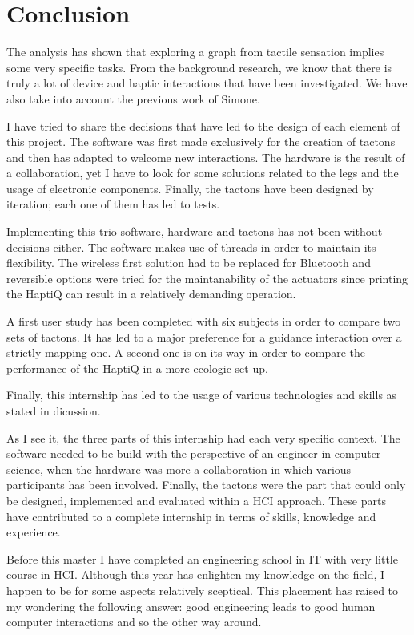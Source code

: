 \chapter{Conclusion}

The analysis has shown that exploring a graph from tactile sensation implies some very specific tasks. From the background research, we know that there is truly a lot of device and haptic interactions that have been investigated. We have also take into account the previous work of Simone.

I have tried to share the decisions that have led to the design of each element of this project. The software was first made exclusively for the creation of tactons and then has adapted to welcome new interactions. The hardware is the result of a collaboration, yet I have to look for some solutions related to the legs and the usage of electronic components. Finally, the tactons have been designed by iteration; each one of them has led to tests.

Implementing this trio software, hardware and tactons has not been without decisions either. The software makes use of threads in order to maintain its flexibility. The wireless first solution had to be replaced for Bluetooth and reversible options were tried for the maintanability of the actuators since printing the HaptiQ can result in a relatively demanding operation.

A first user study has been completed with six subjects in order to compare two sets of tactons. It has led to a major preference for a guidance interaction over a strictly mapping one. A second one is on its way in order to compare the performance of the HaptiQ in a more ecologic set up.

Finally, this internship has led to the usage of various technologies and skills as stated in dicussion.

As I see it, the three parts of this internship had each very specific context. The software needed to be build with the perspective of an engineer in computer science, when the hardware was more a collaboration in which various participants has been involved. Finally, the tactons were the part that could only be designed, implemented and evaluated within a HCI approach. These parts have contributed to a complete internship in terms of skills, knowledge and experience.

Before this master I have completed an engineering school in IT with very little course in HCI. Although this year has enlighten my knowledge on the field, I happen to be for some aspects relatively sceptical. This placement has raised to my wondering the following answer: good engineering leads to good human computer interactions and so the other way around.
